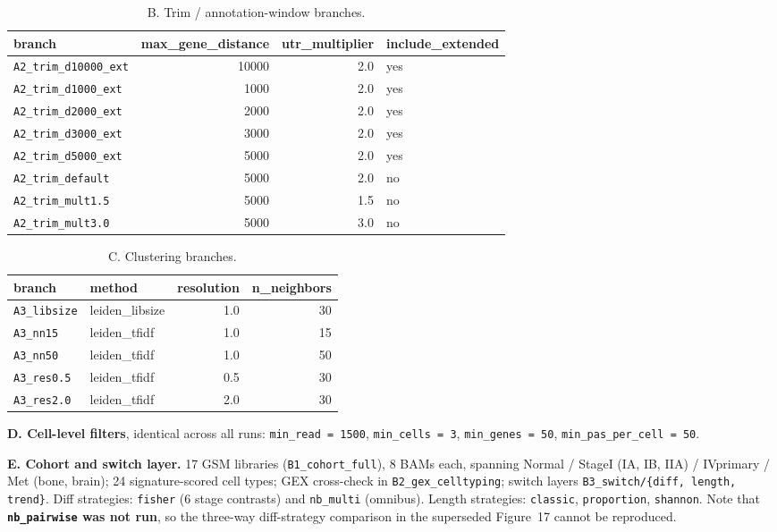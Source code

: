 \documentclass[11pt,a4paper]{article}
\begin{document}
\begin{table}[htbp]
  \centering \small
  \begin{tabular}{lrrl}
    \toprule
    branch & max\_gene\_distance & utr\_multiplier & include\_extended \\
    \midrule
    \texttt{A2\_trim\_d10000\_ext} & 10000 & 2.0 & yes \\
    \texttt{A2\_trim\_d1000\_ext} & 1000 & 2.0 & yes \\
    \texttt{A2\_trim\_d2000\_ext} & 2000 & 2.0 & yes \\
    \texttt{A2\_trim\_d3000\_ext} & 3000 & 2.0 & yes \\
    \texttt{A2\_trim\_d5000\_ext} & 5000 & 2.0 & yes \\
    \texttt{A2\_trim\_default} & 5000 & 2.0 & no \\
    \texttt{A2\_trim\_mult1.5} & 5000 & 1.5 & no \\
    \texttt{A2\_trim\_mult3.0} & 5000 & 3.0 & no \\
    \bottomrule
  \end{tabular}
  \caption{B. Trim / annotation-window branches.}
  \label{tab:matrix_trim}
\end{table}

\begin{table}[htbp]
  \centering \small
  \begin{tabular}{llrr}
    \toprule
    branch & method & resolution & n\_neighbors \\
    \midrule
    \texttt{A3\_libsize} & leiden\_libsize & 1.0 & 30 \\
    \texttt{A3\_nn15} & leiden\_tfidf & 1.0 & 15 \\
    \texttt{A3\_nn50} & leiden\_tfidf & 1.0 & 50 \\
    \texttt{A3\_res0.5} & leiden\_tfidf & 0.5 & 30 \\
    \texttt{A3\_res2.0} & leiden\_tfidf & 2.0 & 30 \\
    \bottomrule
  \end{tabular}
  \caption{C. Clustering branches.}
  \label{tab:matrix_clust}
\end{table}

\noindent\textbf{D. Cell-level filters}, identical across all runs:
\texttt{min\_read = 1500}, \texttt{min\_cells = 3}, \texttt{min\_genes = 50},
\texttt{min\_pas\_per\_cell = 50}.

\medskip
\noindent\textbf{E. Cohort and switch layer.} 17 GSM libraries
(\texttt{B1\_cohort\_full}), 8 BAMs each, spanning Normal / StageI (IA, IB, IIA) /
IVprimary / Met (bone, brain); 24 signature-scored cell types; GEX cross-check in
\texttt{B2\_gex\_celltyping}; switch layers \texttt{B3\_switch/\{diff, length,
trend\}}. Diff strategies: \texttt{fisher} (6 stage contrasts) and
\texttt{nb\_multi} (omnibus). Length strategies: \texttt{classic},
\texttt{proportion}, \texttt{shannon}. Note that \textbf{\texttt{nb\_pairwise} was
not run}, so the three-way diff-strategy comparison in the superseded Figure~17
cannot be reproduced.
\end{document}
